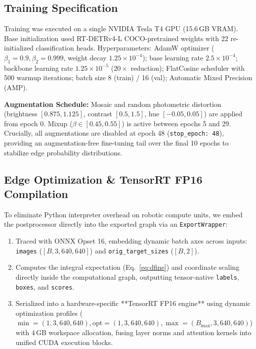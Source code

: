 \documentclass[conference]{IEEEtran}
\begin{document}
\subsection{Training Specification}
Training was executed on a single NVIDIA Tesla T4 GPU (15.6\,GB VRAM). Base initialization used RT-DETRv4-L COCO-pretrained weights with 22 re-initialized classification heads. Hyperparameters: AdamW optimizer ($\beta_1=0.9, \beta_2=0.999$, weight decay $1.25\times10^{-4}$); base learning rate $2.5\times10^{-4}$; backbone learning rate $1.25\times10^{-5}$ ($20\times$ reduction); FlatCosine scheduler with 500 warmup iterations; batch size 8 (train) / 16 (val); Automatic Mixed Precision (AMP).

\textbf{Augmentation Schedule:} Mosaic and random photometric distortion (brightness $[0.875, 1.125]$, contrast $[0.5, 1.5]$, hue $[-0.05, 0.05]$) are applied from epoch 0. Mixup ($\beta \in [0.45, 0.55]$) is active between epochs 5 and 29. Crucially, all augmentations are disabled at epoch 48 (\texttt{stop\_epoch: 48}), providing an augmentation-free fine-tuning tail over the final 10 epochs to stabilize edge probability distributions.

\subsection{Edge Optimization \& TensorRT FP16 Compilation}
To eliminate Python interpreter overhead on robotic compute units, we embed the postprocessor directly into the exported graph via an \texttt{ExportWrapper}:
\begin{enumerate}
    \item Traced with ONNX Opset 16, embedding dynamic batch axes across inputs: \texttt{images} ($[B, 3, 640, 640]$) and \texttt{orig\_target\_sizes} ($[B, 2]$).
    \item Computes the integral expectation (Eq.~\ref{eq:dfine}) and coordinate scaling directly inside the computational graph, outputting tensor-native \texttt{labels}, \texttt{boxes}, and \texttt{scores}.
    \item Serialized into a hardware-specific **TensorRT FP16 engine** using dynamic optimization profiles ($\min=(1, 3, 640, 640), \text{opt}=(1, 3, 640, 640), \max=(B_{\max}, 3, 640, 640)$) with 4\,GB workspace allocation, fusing layer norms and attention kernels into unified CUDA execution blocks.
\end{enumerate}
\end{document}
